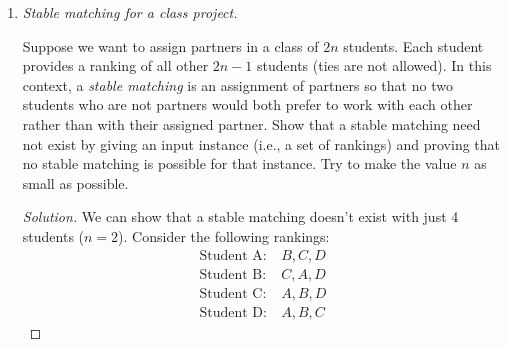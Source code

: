 \documentclass[11pt]{article}
\newcounter{totalpoints}
\newcommand{\points}[1]{\addtocounter{totalpoints}{#1}{[#1 point\ifthenelse{\equal{#1}{1}}{}{s}]}}
\begin{document}
\begin{enumerate}[leftmargin=*,start=0]
\begin{enumerate}
\item \points{10} Does this instance have a unique stable matching? Explain why or why not.
\end{enumerate}

\begin{proof}[Solution]
  \hfill

  \begin{enumerate}
    \item I ran the algorithm by hand and got 
    \[\{ \text{2: A, 1: B, 5: C, 3: D, 8: E, 6: F, 7: G, 4: H} \}\]
    \item \textbf{No}. As proved in class, all outputs from the Gale-Shapley algorithm are stable. 
    However, considering the case where students making offers to employers, we get the follwing output
    \[\{ \text{1: D, 2: A, 3: C, 4: H, 5: B, 6: F, 7: G, 8: E}\}\]
    and this is clearly not the same output as in part A. Therefore, this instance does not have \textbf{unique} stable matching. 
  \end{enumerate}
\end{proof}


\newpage


\item \emph{Stable matching for a class project.} \points{15}

Suppose we want to assign partners in a class of $2n$ students. Each student provides a ranking of all other $2n-1$ students (ties are not allowed). In this context, a \emph{stable matching} is an assignment of partners so that no two students who are not partners would both prefer to work with each other rather than with their assigned partner. Show that a stable matching need not exist by giving an input instance (i.e., a set of rankings) and proving that no stable matching is possible for that instance. Try to make the value $n$ as small as possible.

\begin{proof}[Solution]
We can show that a stable matching doesn't exist with just 4 students ($n=2$). Consider the following rankings:
\begin{align*}
\text{Student A:} & \ B, C, D \\
\text{Student B:} & \ C, A, D\\
\text{Student C:} & \ A, B, D\\
\text{Student D:} & \ A, B, C
\end{align*}


\end{proof}
\end{enumerate}
\end{document}
